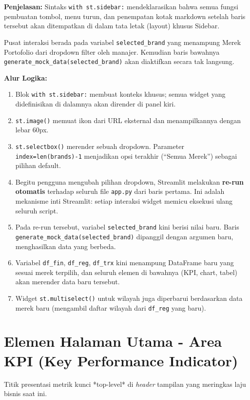 \documentclass{article}
\begin{document}
\textbf{Penjelasan:}
Sintaks \texttt{with st.sidebar:} mendeklarasikan bahwa semua fungsi pembuatan tombol, menu turun, dan penempatan kotak markdown setelah baris tersebut akan ditempatkan di dalam tata letak (layout) khusus Sidebar.

Pusat interaksi berada pada variabel \texttt{selected\_brand} yang menampung Merek Portofolio dari dropdown filter oleh manajer. Kemudian baris bawahnya \texttt{generate\_mock\_data(selected\_brand)} akan diaktifkan secara tak langsung.

\textbf{Alur Logika:}
\begin{enumerate}
	\item Blok \texttt{with st.sidebar:} membuat konteks khusus; semua widget yang didefinisikan di dalamnya akan dirender di panel kiri.
	\item \texttt{st.image()} memuat ikon dari URL eksternal dan menampilkannya dengan lebar 60px.
	\item \texttt{st.selectbox()} merender sebuah dropdown. Parameter \texttt{index=len(brands)-1} menjadikan opsi terakhir (``Semua Merek'') sebagai pilihan default.
	\item Begitu pengguna mengubah pilihan dropdown, Streamlit melakukan \textbf{re-run otomatis} terhadap seluruh file \texttt{app.py} dari baris pertama. Ini adalah mekanisme inti Streamlit: setiap interaksi widget memicu eksekusi ulang seluruh script.
	\item Pada re-run tersebut, variabel \texttt{selected\_brand} kini berisi nilai baru. Baris \texttt{generate\_mock\_data(selected\_brand)} dipanggil dengan argumen baru, menghasilkan data yang berbeda.
	\item Variabel \texttt{df\_fin}, \texttt{df\_reg}, \texttt{df\_trx} kini menampung DataFrame baru yang sesuai merek terpilih, dan seluruh elemen di bawahnya (KPI, chart, tabel) akan merender data baru tersebut.
	\item Widget \texttt{st.multiselect()} untuk wilayah juga diperbarui berdasarkan data merek baru (mengambil daftar wilayah dari \texttt{df\_reg} yang baru).
\end{enumerate}

\section{Elemen Halaman Utama - Area KPI (Key Performance Indicator)}
Titik presentasi metrik kunci *top-level* di \textit{header} tampilan yang meringkas laju bisnis saat ini.
\end{document}
